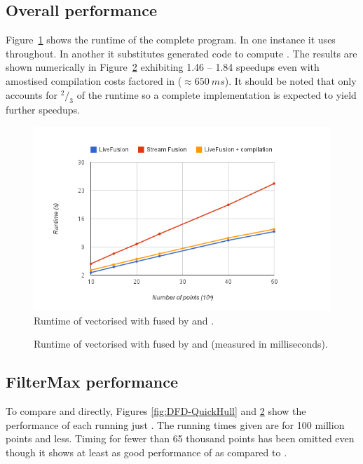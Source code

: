 \documentclass[preamble.tex]{subfiles}
\begin{document}
\subsection{Overall performance}

Figure~\ref{fig:Eval-QuickHull} shows the runtime of the complete \QuickHull program. In one instance it uses \StreamFusion throughout. In another it substitutes \LiveFusion generated code to compute \FilterMax. The results are shown numerically in Figure~\ref{fig:Eval-QuickHull-numbers} exhibiting 1.46 -- 1.84 speedups even with amostised compilation costs factored in ($\approx 650\ ms$). It should be noted that \FilterMax only accounts for $^2/_3$ of the runtime so a complete \LiveFusion implementation is expected to yield further speedups.


\begin{figure}
\includegraphics[scale=0.85,center]{img/Eval-QuickHull}
\caption{Runtime of vectorised \QuickHull with \FilterMax fused by \StreamFusion and \LiveFusion.}
\label{fig:Eval-QuickHull}
\end{figure}


\begin{figure}
\caption{Runtime of vectorised \QuickHull with \FilterMax fused by \StreamFusion and \LiveFusion (measured in milliseconds).}
\label{fig:Eval-QuickHull-numbers}
\end{figure}


\subsection{FilterMax performance}

To compare \LiveFusion and \StreamFusion directly, Figures \ref{fig:DFD-QuickHull} and \ref{fig:Eval-QuickHull-numbers} show the performance of each running just \FilterMax. The running times given are for 100 million points and less. Timing for fewer than 65 thousand points has been omitted even though it shows at least as good performance of \LiveFusion as compared to \StreamFusion.
\end{document}
